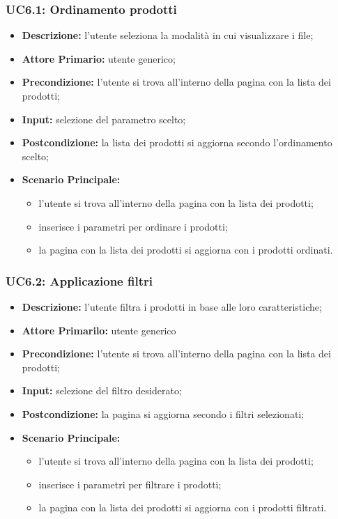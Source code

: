         \subsubsection{UC6.1: Ordinamento prodotti}
        \label{sec:UC6.1}
        \begin{itemize}
            \item \textbf{Descrizione:} l'utente seleziona la modalità in cui visualizzare i file;
            \item \textbf{Attore Primario:} utente generico;
            \item \textbf{Precondizione:} l'utente si trova all'interno della pagina con la lista dei prodotti;
            \item \textbf{Input:} selezione del parametro scelto;
            \item \textbf{Postcondizione:} la lista dei prodotti si aggiorna secondo l'ordinamento scelto;
            \item \textbf{Scenario Principale:}
            \begin{itemize}
                \item l'utente si trova all'interno della pagina con la lista dei prodotti;
                \item inserisce i parametri per ordinare i prodotti;
                \item la pagina con la lista dei prodotti si aggiorna con i prodotti ordinati.
            \end{itemize}
        \end{itemize}
        \subsubsection{UC6.2: Applicazione filtri}
        \label{sec:UC6.2}
        \begin{itemize}
            \item \textbf{Descrizione:} l'utente filtra i prodotti in base alle loro caratteristiche;
            \item \textbf{Attore Primarilo:} utente generico
            \item \textbf{Precondizione:} l'utente si trova all'interno della pagina con la lista dei prodotti;
            \item \textbf{Input:} selezione del filtro desiderato;
            \item \textbf{Postcondizione:} la pagina si aggiorna secondo i filtri selezionati;
            \item \textbf{Scenario Principale:}
            \begin{itemize}
                \item l'utente si trova all'interno della pagina con la lista dei prodotti;
                \item inserisce i parametri per filtrare i prodotti;
                \item la pagina con la lista dei prodotti si aggiorna con i prodotti filtrati.
            \end{itemize}
        \end{itemize}
